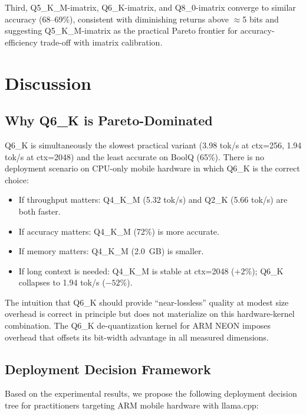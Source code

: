 \documentclass[conference]{IEEEtran}
\begin{document}
Third, Q5\_K\_M-imatrix, Q6\_K-imatrix, and Q8\_0-imatrix converge to similar
accuracy (68--69\%), consistent with diminishing returns above $\approx$5 bits
and suggesting Q5\_K\_M-imatrix as the practical Pareto frontier for
accuracy-efficiency trade-off with imatrix calibration.

\section{Discussion}
\label{sec:discussion}

\subsection{Why Q6\_K is Pareto-Dominated}

Q6\_K is simultaneously the slowest practical variant (3.98 tok/s at ctx=256,
1.94 tok/s at ctx=2048) and the least accurate on BoolQ (65\%).
There is no deployment scenario on CPU-only mobile hardware in which Q6\_K
is the correct choice:
\begin{itemize}
  \item If throughput matters: Q4\_K\_M (5.32 tok/s) and Q2\_K (5.66 tok/s)
        are both faster.
  \item If accuracy matters: Q4\_K\_M (72\%) is more accurate.
  \item If memory matters: Q4\_K\_M (2.0~GB) is smaller.
  \item If long context is needed: Q4\_K\_M is stable at ctx=2048 ($+2\%$);
        Q6\_K collapses to 1.94 tok/s ($-52\%$).
\end{itemize}

The intuition that Q6\_K should provide ``near-lossless'' quality at modest
size overhead is correct in principle but does not materialize on this
hardware-kernel combination. The Q6\_K de-quantization kernel for ARM NEON
imposes overhead that offsets its bit-width advantage in all measured
dimensions.

\subsection{Deployment Decision Framework}

Based on the experimental results, we propose the following deployment
decision tree for practitioners targeting ARM mobile hardware with llama.cpp:
\end{document}
